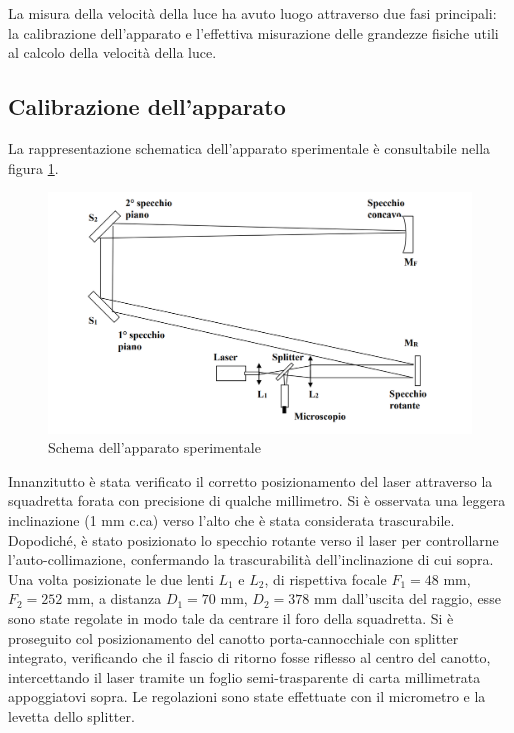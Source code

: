 \documentclass{article}
\begin{document}
        La misura della velocità della luce ha avuto luogo attraverso due fasi principali: la calibrazione dell'apparato e 
        l'effettiva misurazione delle grandezze fisiche utili al calcolo della velocità della luce.

        \subsection{Calibrazione dell'apparato}

            La rappresentazione schematica dell'apparato sperimentale è consultabile nella figura \ref{fig:apparato}.
            
            \begin{figure}[H]

                \centering
                \includegraphics[width=12cm]{../images/apparato.png}

                \caption{Schema dell'apparato sperimentale}
                \label{fig:apparato}
                
            \end{figure}

            Innanzitutto è stata verificato il corretto posizionamento del laser attraverso la squadretta forata con precisione di qualche millimetro. 
            Si è osservata una leggera inclinazione (1 mm c.ca) verso l'alto che è stata considerata trascurabile. 
            Dopodiché, è stato posizionato lo specchio rotante verso il laser per controllarne l'auto-collimazione, 
            confermando la trascurabilità dell'inclinazione di cui sopra. 
            Una volta posizionate le due lenti $L_1$ e $L_2$, di rispettiva focale $F_1 = 48$ mm, $F_2= 252$ mm, 
            a distanza $D_1= 70$ mm, $D_2=378$ mm dall'uscita del raggio, esse sono state regolate in modo tale da centrare il foro della squadretta. 
            Si è proseguito col posizionamento del canotto porta-cannocchiale con splitter integrato, verificando che il fascio di ritorno fosse riflesso 
            al centro del canotto, intercettando il laser tramite un foglio semi-trasparente di carta millimetrata appoggiatovi sopra. 
            Le regolazioni sono state effettuate con il micrometro e la levetta dello splitter. \\
            
\end{document}
